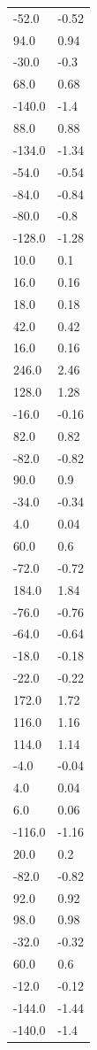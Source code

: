 \begin{longtable}{ll}
-52.0 & -0.52 \\
94.0 & 0.94 \\
-30.0 & -0.3 \\
68.0 & 0.68 \\
-140.0 & -1.4 \\
88.0 & 0.88 \\
-134.0 & -1.34 \\
-54.0 & -0.54 \\
-84.0 & -0.84 \\
-80.0 & -0.8 \\
-128.0 & -1.28 \\
10.0 & 0.1 \\
16.0 & 0.16 \\
18.0 & 0.18 \\
42.0 & 0.42 \\
16.0 & 0.16 \\
246.0 & 2.46 \\
128.0 & 1.28 \\
-16.0 & -0.16 \\
82.0 & 0.82 \\
-82.0 & -0.82 \\
90.0 & 0.9 \\
-34.0 & -0.34 \\
4.0 & 0.04 \\
60.0 & 0.6 \\
-72.0 & -0.72 \\
184.0 & 1.84 \\
-76.0 & -0.76 \\
-64.0 & -0.64 \\
-18.0 & -0.18 \\
-22.0 & -0.22 \\
172.0 & 1.72 \\
116.0 & 1.16 \\
114.0 & 1.14 \\
-4.0 & -0.04 \\
4.0 & 0.04 \\
6.0 & 0.06 \\
-116.0 & -1.16 \\
20.0 & 0.2 \\
-82.0 & -0.82 \\
92.0 & 0.92 \\
98.0 & 0.98 \\
-32.0 & -0.32 \\
60.0 & 0.6 \\
-12.0 & -0.12 \\
-144.0 & -1.44 \\
-140.0 & -1.4 \\

\end{longtable}
